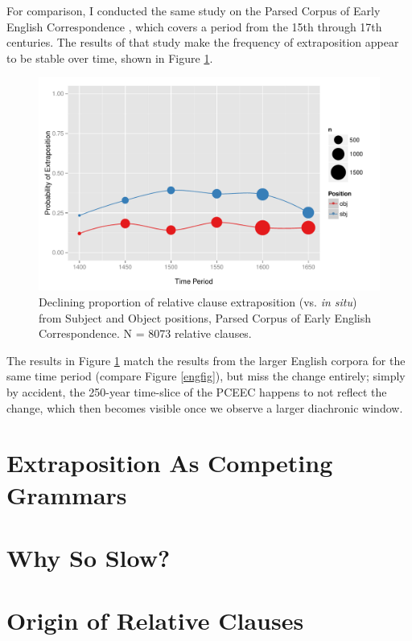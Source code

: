 For comparison, I conducted the same study on the Parsed Corpus of Early English Correspondence \citep[PCEEC][]{pceec}, which covers a period from the 15th through 17th centuries. The results of that study make the frequency of extraposition appear to be stable over time, shown in Figure \ref{pceecfig}.

\begin{figure}
  \includegraphics[width=1.1\textwidth]{stableVarTalks/exSbjObjYearBinned50.pdf}
\caption{Declining proportion of relative clause extraposition (vs. \textsl{in situ}) from Subject and Object positions, Parsed Corpus of Early English Correspondence. N = 8073 relative clauses.}
\label{pceecfig}       
\end{figure}

\noindent The results in Figure \ref{pceecfig} match the results from the larger English corpora for the same time period (compare Figure \ref{engfig}), but miss the change entirely; simply by accident, the 250-year time-slice of the PCEEC happens to not reflect the change, which then becomes visible once we observe a larger diachronic window.



\section{Extraposition As Competing Grammars}

\section{Why So Slow?}
\label{slow}

\section{Origin of Relative Clauses}
\label{pie}

